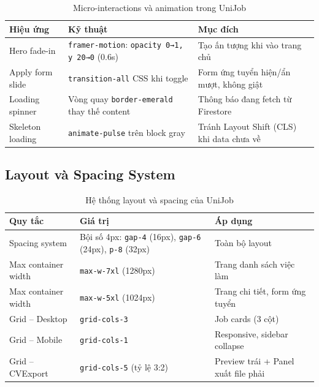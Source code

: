 \begin{table}[H]
\centering
\caption{Micro-interactions và animation trong UniJob}
\renewcommand{\arraystretch}{1.2}
\begin{tabularx}{\textwidth}{|p{3.5cm}|p{3.5cm}|X|}
\hline
\textbf{Hiệu ứng} & \textbf{Kỹ thuật} & \textbf{Mục đích} \\
\hline
Hero fade-in & \texttt{framer-motion}: \texttt{opacity 0→1, y 20→0} (0.6s) & Tạo ấn tượng khi vào trang chủ \\
\hline
Apply form slide & \texttt{transition-all} CSS khi toggle & Form ứng tuyển hiện/ẩn mượt, không giật \\
\hline
Loading spinner & Vòng quay \texttt{border-emerald} thay thế content & Thông báo đang fetch từ Firestore \\
\hline
Skeleton loading & \texttt{animate-pulse} trên block gray & Tránh Layout Shift (CLS) khi data chưa về \\
\hline
\end{tabularx}
\end{table}

\subsection{Layout và Spacing System}

\begin{table}[H]
\centering
\caption{Hệ thống layout và spacing của UniJob}
\renewcommand{\arraystretch}{1.2}
\begin{tabularx}{\textwidth}{|p{3.5cm}|p{4cm}|X|}
\hline
\textbf{Quy tắc} & \textbf{Giá trị} & \textbf{Áp dụng} \\
\hline
Spacing system & Bội số 4px: \texttt{gap-4} (16px), \texttt{gap-6} (24px), \texttt{p-8} (32px) & Toàn bộ layout \\
\hline
Max container width & \texttt{max-w-7xl} (1280px) & Trang danh sách việc làm \\
\hline
Max container width & \texttt{max-w-5xl} (1024px) & Trang chi tiết, form ứng tuyển \\
\hline
Grid -- Desktop & \texttt{grid-cols-3} & Job cards (3 cột) \\
\hline
Grid -- Mobile & \texttt{grid-cols-1} & Responsive, sidebar collapse \\
\hline
Grid -- CVExport & \texttt{grid-cols-5} (tỷ lệ 3:2) & Preview trái + Panel xuất file phải \\
\hline
\end{tabularx}
\end{table}
